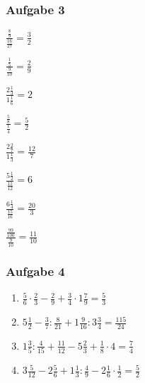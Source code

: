 \subsubsection{Aufgabe 3}
\begin{enumerate}
\begin{multicols}{3}
	\item \quad $ \frac{\frac{8}{9}}{\frac{16}{27}} = \frac{3}{2} $
	\item \quad $ \frac{\frac{1}{5}}{\frac{9}{10}} = \frac{2}{9} $
	\item \quad $ \frac{2\frac{1}{3}}{1\frac{1}{6}} = 2 $
	\item \quad $ \frac{\frac{5}{8}}{\frac{1}{4}} = \frac{5}{2} $
	\item \quad $ \frac{2\frac{2}{7}}{1\frac{1}{3}} = \frac{12}{7} $
	\item \quad $ \frac{5\frac{1}{2}}{\frac{11}{12}} = 6 $
	\item \quad $ \frac{6\frac{1}{4}}{\frac{15}{16}} = \frac{20}{3} $
	\item \quad $ \frac{\frac{99}{100}}{\frac{9}{10}} = \frac{11}{10} $
\end{multicols} 
\end{enumerate}

\subsubsection{Aufgabe 4}
\begin{enumerate}
	\item \quad $ \frac{5}{6} \cdot \frac{2}{3} - \frac{2}{9} + \frac{3}{4} \cdot 1\frac{7}{9} = \frac{5}{3} $
	\item \quad $ 5\frac{1}{2} - \frac{3}{7} : \frac{8}{21} + 1\frac{9}{16} : 3\frac{3}{4} = \frac{115}{24} $
	\item \quad $ 1\frac{3}{5} : \frac{4}{15} + \frac{11}{12} - 5\frac{2}{3} + \frac{1}{8} \cdot 4 = \frac{7}{4} $
	\item \quad $ 3\frac{5}{12} - 2\frac{5}{6} + 1\frac{1}{3} : \frac{4}{9} - 2\frac{1}{6} \cdot \frac{1}{2} = \frac{5}{2} $
\end{enumerate}

